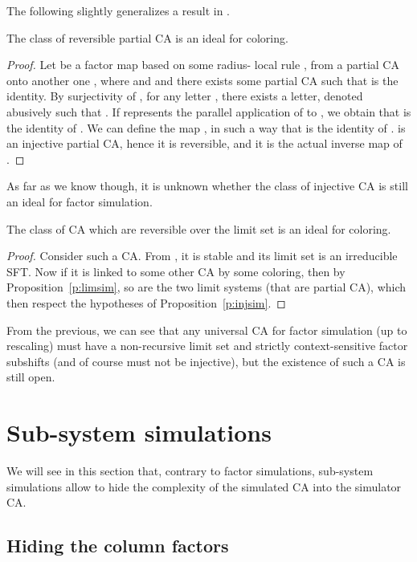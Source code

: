 \documentclass{jac}
\theoremstyle{definition}
\begin{document}
The following slightly generalizes a result in \cite{theyssier}.
\begin{prop}\label{p:injsim}
The class of reversible partial CA is an ideal for coloring.
\end{prop}
\begin{proof}
Let  be a factor map based on some radius- local rule , from a partial CA  onto another one , where  and  and there exists some partial CA  such that  is the identity.
By surjectivity of , for any letter , there exists a letter, denoted abusively  such that . If  represents the parallel application of  to , we obtain that  is the identity of .
We can define the map , in such a way that  is the identity of .  is an injective partial CA, hence it is reversible, and it is the actual inverse map of .
\end{proof}
As far as we know though, it is unknown whether the class of injective CA is still an ideal for factor simulation.
\begin{cor}
The class of CA which are reversible over the limit set is an ideal for coloring.
\end{cor}
\begin{proof}Consider such a CA.
From \cite{revlim}, it is stable and its limit set is an irreducible SFT.
Now if it is linked to some other CA by some coloring, then by Proposition~\ref{p:limsim}, so are the two limit systems (that are partial CA), which then respect the hypotheses of Proposition~\ref{p:injsim}.
\end{proof}

From the previous, we can see that any universal CA for factor simulation (up to rescaling) must have  a non-recursive limit set and strictly context-sensitive factor subshifts (and of course must not be injective), but the existence of such a CA is still open.

\section{Sub-system simulations}\label{s:subsim}
\label{sec:injsimu}

We will see in this section that, contrary to factor simulations, sub-system simulations allow to hide the complexity of the simulated CA into the simulator CA.

\subsection{Hiding the column factors}
\end{document}
